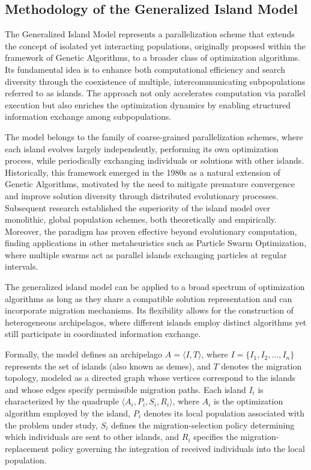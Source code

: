 \subsection{Methodology of the Generalized Island Model}
The Generalized Island Model represents a parallelization scheme that extends the concept of isolated yet interacting populations, originally proposed within the framework of Genetic Algorithms, to a broader class of optimization algorithms. Its fundamental idea is to enhance both computational efficiency and search diversity through the coexistence of multiple, intercommunicating subpopulations referred to as islands. The approach not only accelerates computation via parallel execution but also enriches the optimization dynamics by enabling structured information exchange among subpopulations.

The model belongs to the family of coarse-grained parallelization schemes, where each island evolves largely independently, performing its own optimization process, while periodically exchanging individuals or solutions with other islands. Historically, this framework emerged in the 1980s as a natural extension of Genetic Algorithms, motivated by the need to mitigate premature convergence and improve solution diversity through distributed evolutionary processes. Subsequent research established the superiority of the island model over monolithic, global population schemes, both theoretically and empirically. Moreover, the paradigm has proven effective beyond evolutionary computation, finding applications in other metaheuristics such as Particle Swarm Optimization, where multiple swarms act as parallel islands exchanging particles at regular intervals.

The generalized island model can be applied to a broad spectrum of optimization algorithms as long as they share a compatible solution representation and can incorporate migration mechanisms. Its flexibility allows for the construction of heterogeneous archipelagos, where different islands employ distinct algorithms yet still participate in coordinated information exchange.

Formally, the model defines an archipelago \( A = \langle I, T \rangle \), where \( I = \{ I_1, I_2, \dots, I_n \} \) represents the set of islands (also known as demes), and \( T \) denotes the migration topology, modeled as a directed graph whose vertices correspond to the islands and whose edges specify permissible migration paths. Each island \( I_i \) is characterized by the quadruple \( \langle A_i, P_i, S_i, R_i \rangle \), where \( A_i \) is the optimization algorithm employed by the island, \( P_i \) denotes its local population associated with the problem under study, \( S_i \) defines the migration-selection policy determining which individuals are sent to other islands, and \( R_i \) specifies the migration-replacement policy governing the integration of received individuals into the local population.

